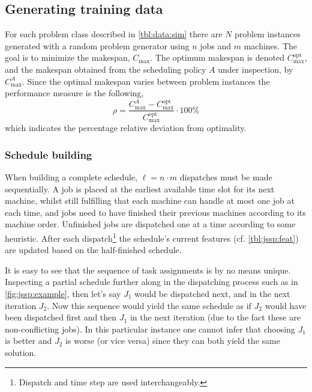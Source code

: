 \documentclass[smallextended]{svjour3}
\begin{document}
	
	\subsection{Generating training data}\label{sec:gentrainingdata}
	For each problem class described in \cref{tbl:data:sim} there are $N$ problem instances generated  with a random problem generator using $n$ jobs and $m$ machines. 
	The goal is to minimize the makespan, $C_{\max}$. The optimum makespan is denoted $C_{\max}^{\text{opt}}$, and the makespan obtained from the scheduling policy $A$ under inspection, by $C_{\max}^{A}$. Since the optimal makespan varies between problem instances the performance measure is the following, 
	\begin{equation}\label{eq:ratio}\rho=\frac{C_{\max}^{A}-C_{\max}^{\text{opt}}}{C_{\max}^{\text{opt}}}\cdot 100\%\end{equation}
	which indicates the percentage relative deviation from optimality. %
	
	\subsubsection{Schedule building}\label{sec:gen:gametree}
	When building a complete schedule, $\ell=n\cdot m$ dispatches must be made sequentially. 
	A job is placed at the earliest available time slot for its next machine, whilst still fulfilling that each machine can handle at most one job at each time, and jobs need to have finished their previous machines according to its machine order. 
	Unfinished jobs are dispatched one at a time according to some heuristic. After each dispatch\footnote{Dispatch and time step are used interchangeably.} the schedule's current features (cf. \cref{tbl:jssp:feat}) are updated based on the half-finished schedule. 
	
	It is easy to see that the sequence of task assignments is by no means unique. Inspecting a partial schedule further along in the dispatching process such as in \cref{fig:jssp:example}, then let's say $J_1$ would be dispatched next, and in the next iteration $J_2$. Now this sequence would yield the same schedule as if $J_2$ would have been dispatched first and then $J_1$ in the next iteration  (due to the fact these are non-conflicting jobs). 
	In this particular instance one cannot infer that choosing $J_1$ is better and $J_2$ is worse (or vice versa) since they can both yield the same solution.
	
\end{document}
